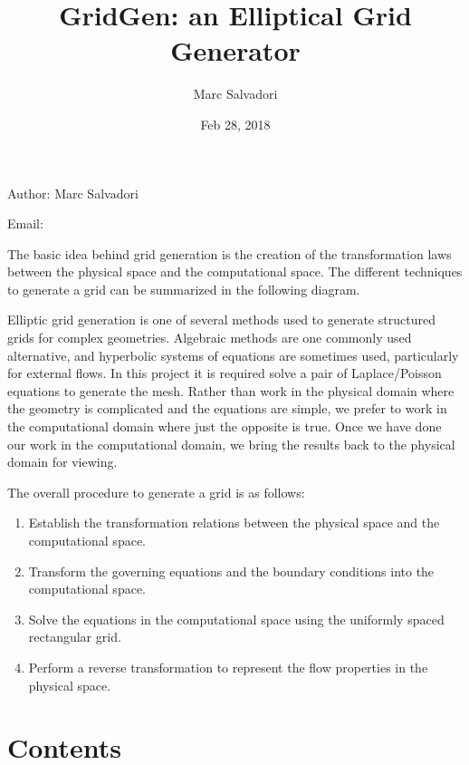 \documentclass[letterpaper,10pt,english]{sphinxmanual}
\title{GridGen: an Elliptical Grid Generator}
\date{Feb 28, 2018}
\author{Marc Salvadori}
\begin{document}
\maketitle
\sphinxtableofcontents
{}\label{\detokenize{index::doc}}


Author: Marc Salvadori

Email: 

The basic idea behind grid generation is the creation of the transformation laws between the physical space and the computational space. The different techniques to generate a grid can be summarized in the following diagram.


Elliptic grid generation is one of several methods used to generate structured grids for complex geometries. Algebraic methods are one commonly used alternative, and hyperbolic systems of equations are sometimes used, particularly for external flows. In this project it is required solve a pair of Laplace/Poisson equations to generate the mesh. Rather than work in the physical domain where the geometry is complicated and the equations are simple, we prefer to work in the computational domain where just the opposite is true. Once we have done our work in the computational domain, we bring the results back to the physical domain for viewing.

The overall procedure to generate a grid is as follows:
\begin{enumerate}
\item {} 
Establish the transformation relations between the physical space and the computational space.

\item {} 
Transform the governing equations and the boundary conditions into the computational space.

\item {} 
Solve the equations in the computational space using the uniformly spaced rectangular grid.

\item {} 
Perform a reverse transformation to represent the flow properties in the physical space.

\end{enumerate}


\chapter{Contents}
\label{\detokenize{index:contents}}\label{\detokenize{index:documentaion-for-elliptic-grid-generation}}
\end{document}
